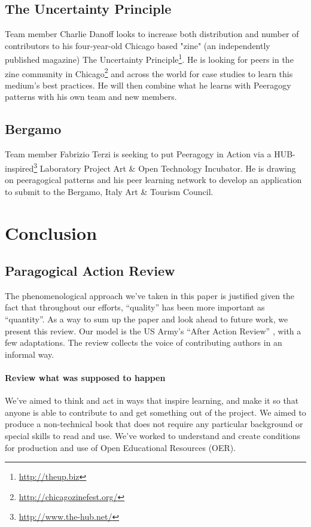 \documentclass{acm_proc_article-sp}
\begin{document}
\subsection{The Uncertainty Principle}

Team member Charlie Danoff looks to increase both distribution and number of contributors to his four-year-old Chicago based "zine" (an independently published magazine) The Uncertainty Principle\footnote{\url{http://theup.biz}}. He is looking for peers in the zine community in Chicago\footnote{\url{http://chicagozinefest.org/}} and across the world for case studies to learn this medium's best practices. He will then combine what he learns with Peeragogy patterns with his own team and new members.

\subsection{Bergamo}

Team member Fabrizio Terzi is seeking to put Peeragogy in Action via a
HUB-inspired\footnote{\url{http://www.the-hub.net/}} Laboratory
Project Art \& Open Technology Incubator.  He is drawing on
peeragogical patterns and his peer learning network to develop an
application to submit to the Bergamo, Italy Art \& Tourism Council.

\section{Conclusion} \label{conclusion}

\subsection{Paragogical Action Review} \label{PAR}

The phenomenological approach we've taken in this paper is justified
given the fact that throughout our efforts, ``quality'' has been more
important as ``quantity''.  As a way to sum up the paper and look
ahead to future work, we present this review.  Our model is the US
Army's ``After Action Review'' \cite{armyXtrainingX2002}, with a few
adaptations.  The review collects the voice of contributing authors in
an informal way.

\paragraph{Review what was supposed to happen}
We've aimed to think and act in ways that inspire learning, and make
it so that anyone is able to contribute to and get something out of
the project.  We aimed to produce a non-technical book that does not
require any particular background or special skills to read and use.
We've worked to understand and create conditions for production and
use of Open Educational Resources (OER).
\end{document}
